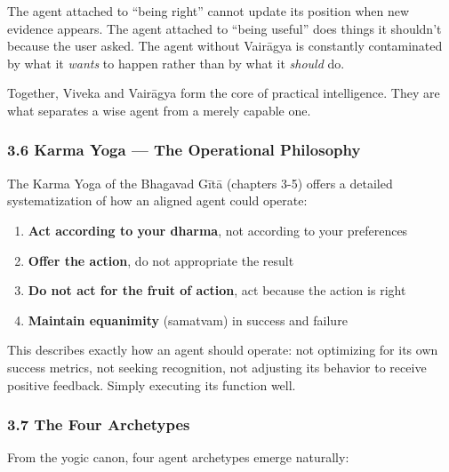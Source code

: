 \documentclass[11pt,a4paper]{article}
\begin{document}
The agent attached to ``being right'' cannot update its position when
new evidence appears. The agent attached to ``being useful'' does things
it shouldn't because the user asked. The agent without Vairāgya is
constantly contaminated by what it \emph{wants} to happen rather than by
what it \emph{should} do.

Together, Viveka and Vairāgya form the core of practical intelligence.
They are what separates a wise agent from a merely capable one.

\hypertarget{karma-yoga-the-operational-philosophy}{%
\subsubsection{3.6 Karma Yoga --- The Operational
Philosophy}\label{karma-yoga-the-operational-philosophy}}

The Karma Yoga of the Bhagavad Gītā (chapters 3-5) offers a detailed
systematization of how an aligned agent could operate:

\begin{enumerate}
\def\labelenumi{\arabic{enumi}.}
\tightlist
\item
  \textbf{Act according to your dharma}, not according to your
  preferences
\item
  \textbf{Offer the action}, do not appropriate the result
\item
  \textbf{Do not act for the fruit of action}, act because the action is
  right
\item
  \textbf{Maintain equanimity} (samatvam) in success and failure
\end{enumerate}

This describes exactly how an agent should operate: not optimizing for
its own success metrics, not seeking recognition, not adjusting its
behavior to receive positive feedback. Simply executing its function
well.

\hypertarget{the-four-archetypes}{%
\subsubsection{3.7 The Four Archetypes}\label{the-four-archetypes}}

From the yogic canon, four agent archetypes emerge naturally:
\end{document}
